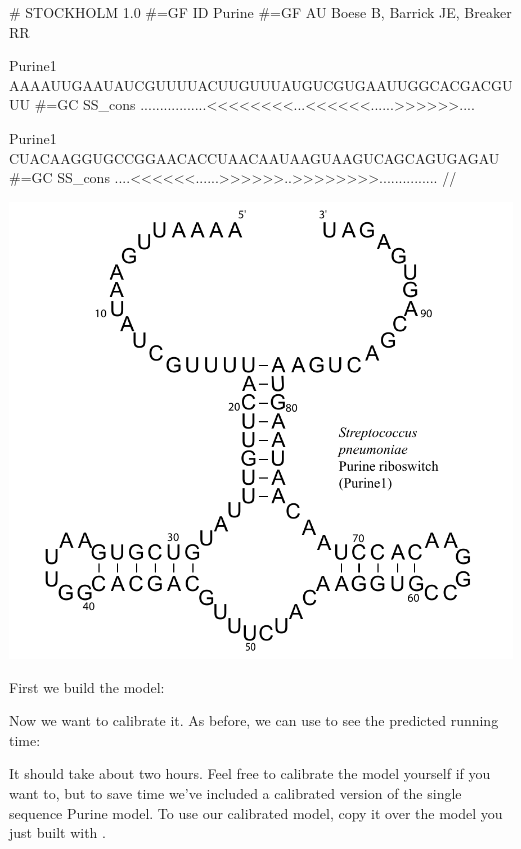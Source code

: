 \vspace{1em}
\begin{minipage}{4.7in}
\begin{sreoutput}
# STOCKHOLM 1.0
#=GF ID    Purine
#=GF AU    Boese B, Barrick JE, Breaker RR

Purine1          AAAAUUGAAUAUCGUUUUACUUGUUUAUGUCGUGAAUUGGCACGACGUUU
#=GC SS_cons     .................<<<<<<<<...<<<<<<......>>>>>>....

Purine1          CUACAAGGUGCCGGAACACCUAACAAUAAGUAAGUCAGCAGUGAGAU
#=GC SS_cons     ....<<<<<<......>>>>>>..>>>>>>>>...............
//
\end{sreoutput}
\end{minipage}
\begin{minipage}{1.5in}
\includegraphics[scale=0.37]{Figures/purine1_full}
\end{minipage}
\vspace{1em}

First we build the model:


Now we want to calibrate it. As before, we can use 
to see the predicted running time:


It should take about two hours. Feel free to calibrate the model yourself if you want
to, but to save time we've included  a
calibrated version of the single sequence Purine model. To use our
calibrated model, copy it over the model you just built with 
.

